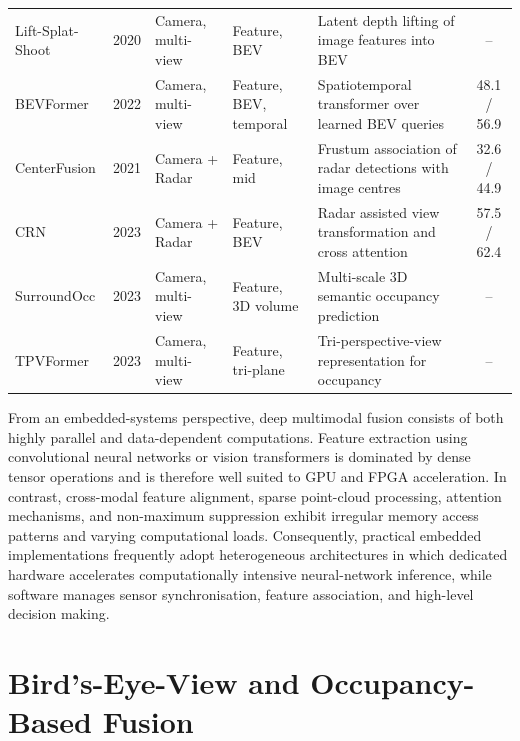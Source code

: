 \documentclass[11pt,oneside,openany]{book}
\begin{document}
\begin{table}[!t]
\begin{tabularx}{\textwidth}{
    L
    c
    L
    L
    L
    c
}
Lift-Splat-Shoot \cite{philion2020_lss}
& 2020
& Camera, multi-view
& Feature, BEV
& Latent depth lifting of image features into BEV
& -- \\

BEVFormer \cite{li2022_bevformer}
& 2022
& Camera, multi-view
& Feature, BEV, temporal
& Spatiotemporal transformer over learned BEV queries
& 48.1 / 56.9 \\

CenterFusion \cite{nabati2021_centerfusion}
& 2021
& Camera + Radar
& Feature, mid
& Frustum association of radar detections with image centres
& 32.6 / 44.9 \\

CRN \cite{kim2023_crn}
& 2023
& Camera + Radar
& Feature, BEV
& Radar assisted view transformation and cross attention
& 57.5 / 62.4 \\

SurroundOcc \cite{wei2023_surroundocc}
& 2023
& Camera, multi-view
& Feature, 3D volume
& Multi-scale 3D semantic occupancy prediction
& -- \\

TPVFormer \cite{huang2023_tpvformer}
& 2023
& Camera, multi-view
& Feature, tri-plane
& Tri-perspective-view representation for occupancy
& -- \\

\hline
\end{tabularx}
\end{table}

From an embedded-systems perspective, deep multimodal fusion consists of both highly parallel and data-dependent computations. Feature extraction using convolutional neural networks or vision transformers is dominated by dense tensor operations and is therefore well suited to GPU and FPGA acceleration. In contrast, cross-modal feature alignment, sparse point-cloud processing, attention mechanisms, and non-maximum suppression exhibit irregular memory access patterns and varying computational loads. Consequently, practical embedded implementations frequently adopt heterogeneous architectures in which dedicated hardware accelerates computationally intensive neural-network inference, while software manages sensor synchronisation, feature association, and high-level decision making.

\section{Bird's-Eye-View and Occupancy-Based Fusion}
\end{document}
